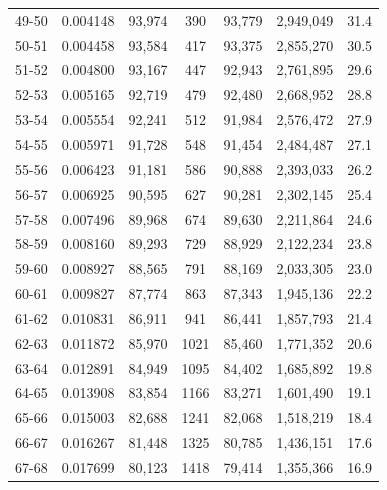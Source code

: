 \documentclass[12pt,a4paper]{article}
\begin{document}
\begin{longtable}{|c|c|c|c|c|c|c|}
49-50  & 0.004148      & 93,974       & 390           & 93,779        & 2,949,049    & 31.4         \\
50-51  & 0.004458      & 93,584       & 417           & 93,375        & 2,855,270    & 30.5         \\
51-52  & 0.004800      & 93,167       & 447           & 92,943        & 2,761,895    & 29.6         \\
52-53  & 0.005165      & 92,719       & 479           & 92,480        & 2,668,952    & 28.8         \\
53-54  & 0.005554      & 92,241       & 512           & 91,984        & 2,576,472    & 27.9         \\
54-55  & 0.005971      & 91,728       & 548           & 91,454        & 2,484,487    & 27.1         \\
55-56  & 0.006423      & 91,181       & 586           & 90,888        & 2,393,033    & 26.2         \\
56-57  & 0.006925      & 90,595       & 627           & 90,281        & 2,302,145    & 25.4         \\
57-58  & 0.007496      & 89,968       & 674           & 89,630        & 2,211,864    & 24.6         \\
58-59  & 0.008160      & 89,293       & 729           & 88,929        & 2,122,234    & 23.8         \\
59-60  & 0.008927      & 88,565       & 791           & 88,169        & 2,033,305    & 23.0         \\
60-61  & 0.009827      & 87,774       & 863           & 87,343        & 1,945,136    & 22.2         \\
61-62  & 0.010831      & 86,911       & 941           & 86,441        & 1,857,793    & 21.4         \\
62-63  & 0.011872      & 85,970       & 1021          & 85,460        & 1,771,352    & 20.6         \\
63-64  & 0.012891      & 84,949       & 1095          & 84,402        & 1,685,892    & 19.8         \\
64-65  & 0.013908      & 83,854       & 1166          & 83,271        & 1,601,490    & 19.1         \\
65-66  & 0.015003      & 82,688       & 1241          & 82,068        & 1,518,219    & 18.4         \\
66-67  & 0.016267      & 81,448       & 1325          & 80,785        & 1,436,151    & 17.6         \\
67-68  & 0.017699      & 80,123       & 1418          & 79,414        & 1,355,366    & 16.9         \\

\end{longtable}
\end{document}
